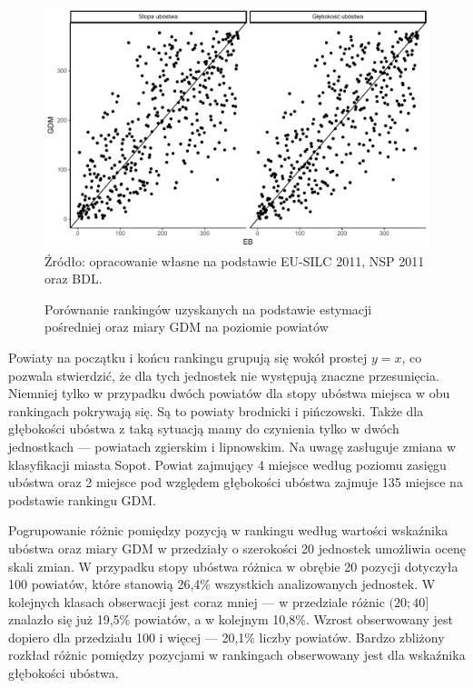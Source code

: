 \begin{figure}[ht]
\caption{Porównanie rankingów uzyskanych na podstawie estymacji pośredniej oraz miary GDM na poziomie powiatów}
\centering
\includegraphics[width=\textwidth]{05_wykresy/jedn_gdm-1.pdf}\\
\small{Źródło: opracowanie własne na podstawie EU-SILC 2011, NSP 2011 oraz BDL.}
\label{fig:jedn-gdm}
\end{figure}

Powiaty na początku i końcu rankingu grupują się wokół prostej $y=x$, co pozwala stwierdzić, że dla tych jednostek nie występują znaczne przesunięcia. Niemniej tylko w przypadku dwóch powiatów dla stopy ubóstwa miejsca w obu rankingach pokrywają się. Są to powiaty brodnicki i pińczowski. Także dla głębokości ubóstwa z taką sytuacją mamy do czynienia tylko w dwóch jednostkach --- powiatach zgierskim i lipnowskim. Na uwagę zasługuje zmiana w klasyfikacji miasta Sopot. Powiat zajmujący 4 miejsce według poziomu zasięgu ubóstwa oraz 2 miejsce pod względem głębokości ubóstwa zajmuje 135 miejsce na podstawie rankingu GDM. 

Pogrupowanie różnic pomiędzy pozycją w rankingu według wartości wskaźnika ubóstwa oraz miary GDM w przedziały o szerokości 20 jednostek umożliwia ocenę skali zmian. W przypadku stopy ubóstwa różnica w obrębie 20 pozycji dotyczyła 100 powiatów, które stanowią 26,4\% wszystkich analizowanych jednostek. W kolejnych klasach obserwacji jest coraz mniej --- w przedziale różnic $(20;40]$ znalazło się już 19,5\% powiatów, a w kolejnym 10,8\%. Wzrost obserwowany jest dopiero dla przedziału 100 i więcej --- 20,1\% liczby powiatów. Bardzo zbliżony rozkład różnic pomiędzy pozycjami w rankingach obserwowany jest dla wskaźnika głębokości ubóstwa. 

